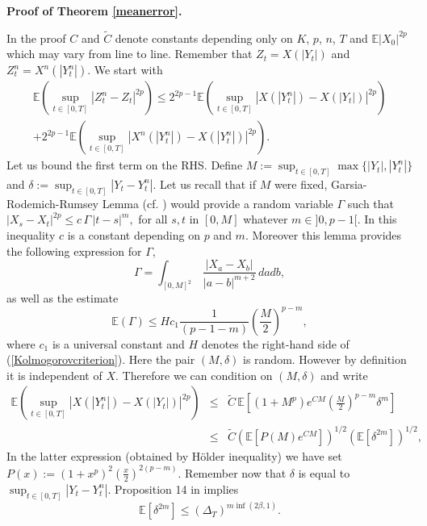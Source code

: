 \documentclass[a4paper, 11pt]{article}
\newcommand{\E}{\mathbb{E}}
\newcommand{\1}{\mathbf{1}}
\begin{document}
\medskip

\noindent\textbf{Proof of Theorem \ref{meanerror}.}

In the proof $C$ and $\tilde C$ denote constants depending only on $K$, $p$, $n$, $T$ and $\E|X_0|^{2p}$ which may vary from line to line. Remember that $Z_t=X(|Y_t|)$ and $Z^n_t=X^n(|Y_t^n|)$. We start with
\begin{multline} 
\E\left(\sup_{t\in[0,T]} |Z^n_t-Z_t|^{2p}\right)\leq 2^{2p-1}\E\left(\sup_{t\in[0,T]} |X(|Y_t^n|)-X(|Y_t|)|^{2p}\right) \\
+2^{2p-1}\E\left(\sup_{t\in[0,T]} |X^n(|Y_t^n|)-X(|Y_t^n|)|^{2p}\right). \label{eq:82}
\end{multline}
Let us bound the first term on the RHS. Define $M:=\sup_{t\in[0,T]} \max \{|Y_t|,|Y_t^n|\}$ and $\delta:=\sup_{t\in[0,T]} |Y_t-Y_t^n|$. Let us recall that if $M$ were fixed, Garsia-Rodemich-Rumsey Lemma (cf. \cite{garsia}) would provide a random variable $\Gamma$ such that $|X_s-X_t|^{2p}\leq c\, \Gamma\,  |t-s|^m,$ for all $s,t$ in $[0,M]$ whatever $m\in]0,p-1[$. In this inequality $c$ is a constant depending on $p$ and $m$. Moreover this lemma provides the following expression for $\Gamma$,
\begin{equation}\label{expressiondegamma}
\Gamma= \int_{[0,M]^2}\, \frac{|X_a-X_b|}{|a-b|^{m+2}}\, da db,
\end{equation}
as well as the estimate
\begin{equation*}
\E (\Gamma)\leq H c_1 \frac{1}{(p-1-m)}(\frac{M}{2})^{p-m},
\end{equation*}
where $c_1$ is a universal constant and $H$ denotes the right-hand side of (\ref{Kolmogorovcriterion}). Here the pair $(M,\delta)$ is random. However by definition it is independent of $X$. Therefore we can condition on $(M,\delta)$ and write 
\begin{eqnarray*}
\E\left(\sup_{t\in[0,T]} |X(|Y_t^n|)-X(|Y_t|)|^{2p}\right)&\leq& {\tilde C}\, \E\left[ (1+M^p)e^{CM}(\frac{M}{2})^{p-m}\delta^m \right]\\
&\leq& \tilde C\left(\E\left[ P(M)e^{CM}\right] \right)^{1/2} (\E [\delta^{2m} ])^{1/2},
\end{eqnarray*}
In the latter expression (obtained by H\"older inequality) we have set $P(x):=(1+x^p)^2(\frac{x}{2})^{2(p-m)}$. Remember now that $\delta$ is equal to $\sup_{t\in[0,T]} |Y_t-Y_t^n|$. Proposition 14 in \cite{faure} implies
\begin{equation*}
\E [\delta^{2m} ]\leq (\Delta_T)^{m\inf (2\beta,1)}.
\end{equation*}
\end{document}
